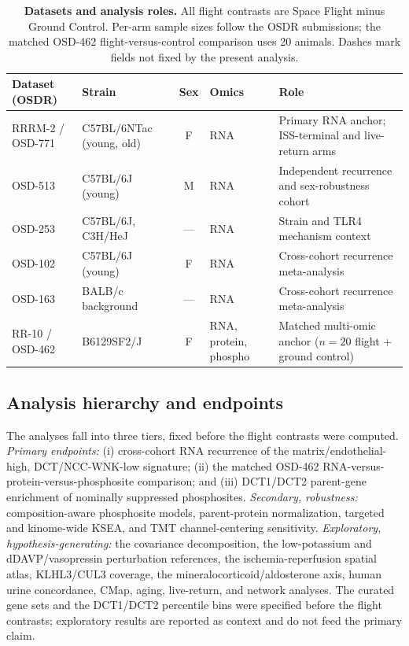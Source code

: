 \documentclass[11pt]{article}
\begin{document}
\begin{table}[H]
\centering\small
\caption{\textbf{Datasets and analysis roles.} All flight contrasts are Space Flight minus Ground Control. Per-arm sample sizes follow the OSDR submissions; the matched OSD-462 flight-versus-control comparison uses 20 animals. Dashes mark fields not fixed by the present analysis.}
\label{tab:datasets}
\begin{tabularx}{\textwidth}{@{}lp{2.5cm}cp{2.3cm}Y@{}}
\toprule
Dataset (OSDR) & Strain & Sex & Omics & Role \\
\midrule
RRRM-2 / OSD-771 & C57BL/6NTac (young, old) & F & RNA & Primary RNA anchor; ISS-terminal and live-return arms \\
OSD-513 & C57BL/6J (young) & M & RNA & Independent recurrence and sex-robustness cohort \\
OSD-253 & C57BL/6J, C3H/HeJ & --- & RNA & Strain and TLR4 mechanism context \\
OSD-102 & C57BL/6J (young) & F & RNA & Cross-cohort recurrence meta-analysis \\
OSD-163 & BALB/c background & --- & RNA & Cross-cohort recurrence meta-analysis \\
RR-10 / OSD-462 & B6129SF2/J & F & RNA, protein, phospho & Matched multi-omic anchor ($n=20$ flight + ground control) \\
\bottomrule
\end{tabularx}
\end{table}

\subsection{Analysis hierarchy and endpoints}

The analyses fall into three tiers, fixed before the flight contrasts were computed. \emph{Primary endpoints:} (i) cross-cohort RNA recurrence of the matrix/endothelial-high, DCT/NCC-WNK-low signature; (ii) the matched OSD-462 RNA-versus-protein-versus-phosphosite comparison; and (iii) DCT1/DCT2 parent-gene enrichment of nominally suppressed phosphosites. \emph{Secondary, robustness:} composition-aware phosphosite models, parent-protein normalization, targeted and kinome-wide KSEA, and TMT channel-centering sensitivity. \emph{Exploratory, hypothesis-generating:} the covariance decomposition, the low-potassium and dDAVP/vasopressin perturbation references, the ischemia-reperfusion spatial atlas, KLHL3/CUL3 coverage, the mineralocorticoid/aldosterone axis, human urine concordance, CMap, aging, live-return, and network analyses. The curated gene sets and the DCT1/DCT2 percentile bins were specified before the flight contrasts; exploratory results are reported as context and do not feed the primary claim.
\end{document}
